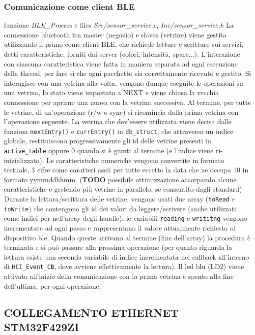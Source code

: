 \documentclass{article}
\begin{document}
\subsubsection{Comunicazione come client BLE}
funzione \textit{BLE\_Process} e files \textit{Src/sensor\_service.c}, \textit{Inc/sensor\_service.h}
La connessione bluetooth tra master (negozio) e slaves (vetrine) viene gestita utilizzando il primo come client BLE, che richiede letture e scritture sui servizi, detti caratteristiche, forniti dai server (colori, intensit\`{a}, spare...). L'interazione con ciascuna caratteristica viene fatta in maniera separata ad ogni esecuzione della thread, per fare s\`{i} che ogni pacchetto sia correttamente ricevuto e gestito. Si interagisce con una vetrina alla volta, vengono dunque eseguite le operazioni su una vetrina, lo stato viene impostato a NEXT e viene chiusa la vecchia connessione per aprirne una nuova con la vetrina successiva. Al termine, per tutte le vetrine, di un'operazione (r/w o sync) si ricomincia dalla prima vetrina con l'operazione seguente. La vetrina che dev'essere utilizzata viene decisa dalle funzioni \texttt{nextEntry()} e \texttt{currEntry()} in \texttt{db\_struct}, che attraverso un indice globale, restituiscono progressivamente gli id delle vetrine presenti in \texttt{active\_table} oppure 0 quando si \`{e} giunti al termine (e l'indice viene ri-inizializzato). 
Le caratteristiche numeriche vengono convertite in formato testuale, 3 cifre come caratteri ascii per tutte eccetto la data che ne occupa 10 in formato yymmddhhmm. (\textbf{TODO} possibile ottimizzazione accorpando alcune caratteristiche e gestendo pi\`{u} vetrine in parallelo, se consentito dagli standard)
Durante la lettura/scrittura delle vetrine, vengono usati due array (\texttt{toRead} e \texttt{toWrite}) che contengono gli id dei valori da leggere/scrivere (anche utilizzati come indici per nell'array degli handle), le variabili \texttt{reading} e \texttt{writitng} vengono incrementate ad ogni passo e rappresentano il valore attualmente richiesto al dispositivo ble. Quando queste arrivano al termine (fine dell'array) la procedura \`{e} terminata e si pu\`{o} passare alla prossima operazione (per quanto riguarda la lettura esiste una seconda variabile di indice incrementata nel callback all'interno di \texttt{HCI\_Event\_CB}, dove avviene effettivamente la lettura).
Il led blu (LD2) viene attivato all'inizio della comunicazione con la prima vetrina e spento alla fine dell'ultima, per ogni operazione.

\subsection{COLLEGAMENTO ETHERNET STM32F429ZI}
 
\end{document}
